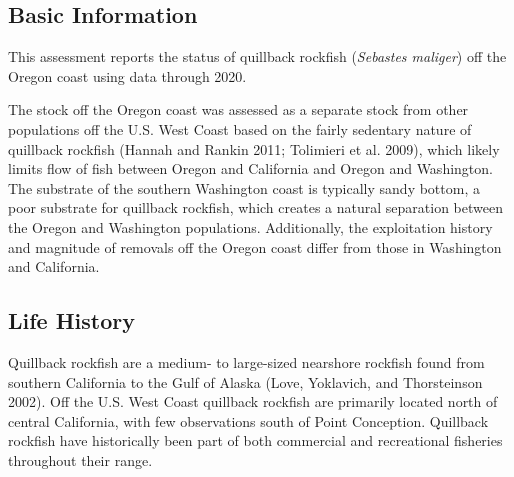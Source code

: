\documentclass[11pt,
  english,
  a4paper,
]{article}
\begin{document}

\hypertarget{basic-information}{%
\subsection{Basic Information}\label{basic-information}}

\leavevmode\tagmcend\tagstructend


This assessment reports the status of quillback rockfish (\emph{Sebastes maliger}) off the Oregon coast using data through 2020.

\leavevmode\tagmcend\tagstructend\par


The stock off the Oregon coast was assessed as a separate stock from other populations off the U.S. West Coast based on the fairly sedentary nature of quillback rockfish {(Hannah and Rankin 2011; Tolimieri et al. 2009)\leavevmode\tagmcend\tagstructend}, which likely limits flow of fish between Oregon and California and Oregon and Washington. The substrate of the southern Washington coast is typically sandy bottom, a poor substrate for quillback rockfish, which creates a natural separation between the Oregon and Washington populations. Additionally, the exploitation history and magnitude of removals off the Oregon coast differ from those in Washington and California.

\leavevmode\tagmcend\tagstructend\par


\hypertarget{life-history}{%
\subsection{Life History}\label{life-history}}

\leavevmode\tagmcend\tagstructend


Quillback rockfish are a medium- to large-sized nearshore rockfish found from southern California to the Gulf of Alaska {(Love, Yoklavich, and Thorsteinson 2002)\leavevmode\tagmcend\tagstructend}. Off the U.S. West Coast quillback rockfish are primarily located north of central California, with few observations south of Point Conception. Quillback rockfish have historically been part of both commercial and recreational fisheries throughout their range.
\end{document}
